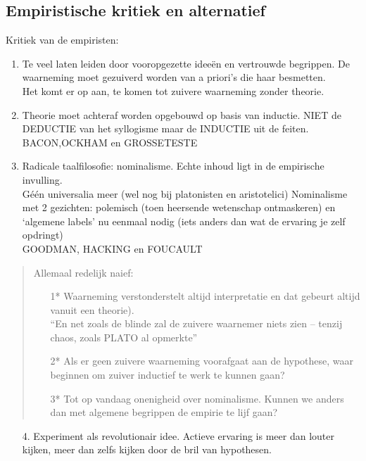 \subsection{Empiristische kritiek en alternatief}
Kritiek van de empiristen:
\begin{enumerate}
\item Te veel laten leiden door vooropgezette ideeën en vertrouwde begrippen. De waarneming moet gezuiverd worden van a priori's die haar besmetten.
\\Het komt er op aan, te komen tot zuivere waarneming zonder theorie.
\item Theorie moet achteraf worden opgebouwd op basis van inductie.
NIET de DEDUCTIE van het syllogisme maar de INDUCTIE uit de feiten.
\\
BACON,OCKHAM en GROSSETESTE
\item Radicale taalfilosofie: nominalisme. Echte inhoud ligt in de empirische invulling. 
\\
G\'e\'en universalia meer (wel nog bij platonisten en aristotelici)
Nominalisme met 2 gezichten: polemisch (toen heersende wetenschap ontmaskeren) en ‘algemene labels’ nu eenmaal nodig (iets anders dan wat de ervaring je zelf opdringt)
\\
GOODMAN, HACKING en FOUCAULT
\end{enumerate}
\begin{quote}
Allemaal redelijk naief:
\begin{enumerate}
\item[1*] Waarneming verstonderstelt altijd interpretatie en dat gebeurt altijd vanuit een theorie).
\\
“En net zoals de blinde zal de zuivere waarnemer niets zien – tenzij chaos, zoals PLATO al opmerkte”
\item[2*] Als er geen zuivere waarneming voorafgaat aan de hypothese, waar beginnen om zuiver inductief te werk te kunnen gaan?
\item[3*] Tot op vandaag onenigheid over nominalisme. Kunnen we anders dan met algemene begrippen de empirie te lijf gaan?
\end{enumerate}
\end{quote}
\begin{enumerate}
 \item[4.] Experiment als revolutionair idee. Actieve ervaring is meer dan louter kijken, meer dan zelfs kijken door de bril van hypothesen.
\end{enumerate}
